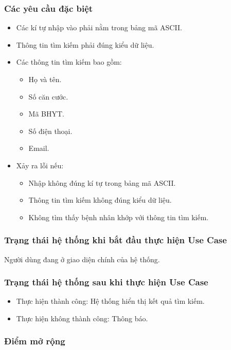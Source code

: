 \subsubsection{Các yêu cầu đặc biệt}
\begin{itemize}
  \item Các kí tự nhập vào phải nằm trong bảng mã ASCII.
  \item Thông tin tìm kiếm phải đúng kiểu dữ liệu.
  \item Các thông tin tìm kiếm bao gồm:
    \begin{itemize}
      \item Họ và tên.
      \item Số căn cước.
      \item Mã BHYT.
      \item Số điện thoại.
      \item Email.
    \end{itemize}
  \item Xảy ra lỗi nếu:
    \begin{itemize}
      \item Nhập không đúng kí tự trong bảng mã ASCII.
      \item Thông tin tìm kiếm không đúng kiểu dữ liệu.
      \item Không tìm thấy bệnh nhân khớp với thông tin tìm kiếm.
    \end{itemize}
\end{itemize}

\subsubsection{Trạng thái hệ thống khi bắt đầu thực hiện Use Case}
Người dùng đang ở giao diện chính của hệ thống.

\subsubsection{Trạng thái hệ thống sau khi thực hiện Use Case}
\begin{itemize}
  \item Thực hiện thành công: Hệ thống hiển thị kết quả tìm kiếm.
  \item Thực hiện không thành công: Thông báo.
\end{itemize}

\subsubsection{Điểm mở rộng}